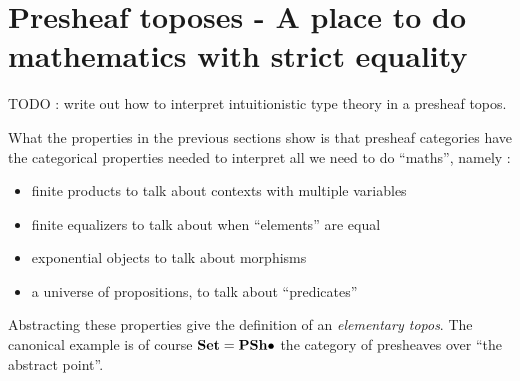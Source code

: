 \documentclass{article}
\begin{document}
\section{Presheaf toposes - A place to do mathematics with strict equality}

TODO : write out how to interpret intuitionistic type theory
in a presheaf topos.

\begin{rmk}
  
  What the properties in the previous sections show is that
  presheaf categories have the categorical properties
  needed to interpret all we need to do ``maths'', 
  namely : 
  \begin{itemize}
    \item finite products to talk about contexts with multiple variables
    \item finite equalizers to talk about when ``elements'' are equal
    \item exponential objects to talk about morphisms
    \item a universe of propositions, to talk about ``predicates''
  \end{itemize}
  Abstracting these properties
  give the definition of an \emph{elementary topos}.
  The canonical example is of course $\mathbf{Set} = \mathbf{PSh}\bullet$
  the category of presheaves over ``the abstract point''.
  
\end{rmk}


\end{document}
